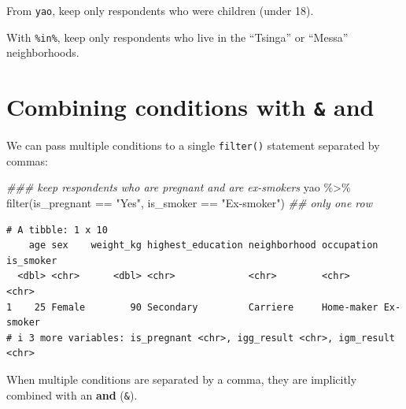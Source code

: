 \documentclass[
  letterpaper,
  DIV=11,
  numbers=noendperiod]{scrreprt}
\newenvironment{Shaded}{\begin{snugshade}}{\end{snugshade}}
\newcommand{\DocumentationTok}[1]{\textcolor[rgb]{0.37,0.37,0.37}{\textit{#1}}}
\newcommand{\FunctionTok}[1]{\textcolor[rgb]{0.28,0.35,0.67}{#1}}
\newcommand{\NormalTok}[1]{\textcolor[rgb]{0.00,0.23,0.31}{#1}}
\newcommand{\SpecialCharTok}[1]{\textcolor[rgb]{0.37,0.37,0.37}{#1}}
\newcommand{\StringTok}[1]{\textcolor[rgb]{0.13,0.47,0.30}{#1}}
\begin{document}
\begin{tcolorbox}[enhanced jigsaw, title=\textcolor{quarto-callout-tip-color}{\faLightbulb}\hspace{0.5em}{Practice}, colbacktitle=quarto-callout-tip-color!10!white, leftrule=.75mm, arc=.35mm, opacityback=0, bottomrule=.15mm, rightrule=.15mm, toptitle=1mm, breakable, toprule=.15mm, colback=white, coltitle=black, colframe=quarto-callout-tip-color-frame, bottomtitle=1mm, titlerule=0mm, left=2mm, opacitybacktitle=0.6]

From \texttt{yao}, keep only respondents who were children (under 18).

With \texttt{\%in\%}, keep only respondents who live in the ``Tsinga''
or ``Messa'' neighborhoods.

\end{tcolorbox}

\section{\texorpdfstring{Combining conditions with \texttt{\&} and
\texttt{\textbar{}}}{Combining conditions with \& and \textbar{}}}\label{combining-conditions-with-and}

We can pass multiple conditions to a single \texttt{filter()} statement
separated by commas:

\begin{Shaded}
\begin{Highlighting}[]
\DocumentationTok{\#\#\# keep respondents who are pregnant and are ex{-}smokers}
\NormalTok{yao }\SpecialCharTok{\%\textgreater{}\%} \FunctionTok{filter}\NormalTok{(is\_pregnant }\SpecialCharTok{==} \StringTok{"Yes"}\NormalTok{, is\_smoker }\SpecialCharTok{==} \StringTok{"Ex{-}smoker"}\NormalTok{) }\DocumentationTok{\#\# only one row}
\end{Highlighting}
\end{Shaded}

\begin{verbatim}
# A tibble: 1 x 10
    age sex    weight_kg highest_education neighborhood occupation is_smoker
  <dbl> <chr>      <dbl> <chr>             <chr>        <chr>      <chr>    
1    25 Female        90 Secondary         Carriere     Home-maker Ex-smoker
# i 3 more variables: is_pregnant <chr>, igg_result <chr>, igm_result <chr>
\end{verbatim}

When multiple conditions are separated by a comma, they are implicitly
combined with an \textbf{and} (\texttt{\&}).
\end{document}

